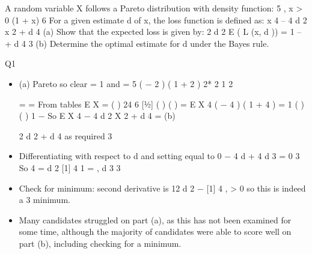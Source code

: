 \documentclass[a4paper,12pt]{article}
\begin{document}
A random variable X follows a Pareto distribution with density function:
5
, x > 0
(1 + x) 6
For a given estimate d of x, the loss function is defined as:
x 4 – 4 d 2 x 2 + d 4
(a)
Show that the expected loss is given by:
2 d 2
E ( L (x, d )) = 1 –
+ d 4
3
(b)
Determine the optimal estimate for d under the Bayes rule.




\newpage
Q1
\begin{itemize}
\item (a)
Pareto so clear \lambda  = 1 and \alpha  = 5 
\Gamma ( \alpha  − 2 ) \Gamma ( 1 + 2 ) 2* 2 1
2
  
= =
From tables E X =
\Gamma ( \alpha  )
24 6 [1⁄2]
( )
( )
=
E X 4
\Gamma ( \alpha  − 4 ) \Gamma ( 1 + 4 )
= 1
\Gamma ( \alpha  )
(
)
1 −
So E X 4 − 4 d 2 X 2 + d 4 =
(b)

2 d 2
+ d 4 as required
3
\item 
Differentiating with respect to d and setting equal to 0
−
4 d
+ 4 d 3 = 0
3
So 4 =
d 2
[1]
4
1
=
,  
d
3
3
\item Check for minimum: second derivative is 12 d 2 −
[1]
4
, > 0 so this is indeed a
3
minimum.
\item 
Many candidates struggled on part (a), as this has not been examined for some time, although the majority of candidates were able to score well on part (b), including checking for a minimum.
\end{itemize}
\end{document}
